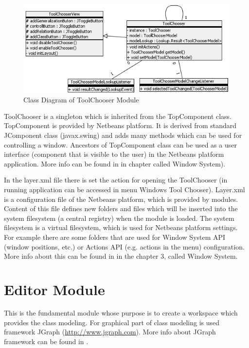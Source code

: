 \begin{figure}[!ht]
\begin{center}
\includegraphics[width=\textwidth]{img/ToolChooserModuleToolChooser.png}
\caption{Class Diagram of ToolChooser Module}
\label{f-ToolChooserModuleToolChooser}
\end{center}
\end{figure}

ToolChooser is a singleton which is inherited from the TopComponent class. TopComponent is provided by Netbeans platform. It is derived from standard JComponent class (javax.swing) and adds many methods which can be used for controlling a window. Ancestors of TopComponent class can be used as a user interface (component that is visible to the user) in the Netbeans platform application. More info can be found in \cite{netbeans6.9DevGuide} in chapter called Window System).

In the layer.xml file there is set the action for opening the ToolChooser (in running application can be accessed in menu Windows  Tool Chooser). Layer.xml is a configuration file of the Netbeans platform, which is provided by modules. Content of this file defines new folders and files which will be inserted into the system filesystem (a central registry) when the module is loaded. The system filesystem is a virtual filesystem, which is used for Netbeans platform settings. For example there are some folders that are used for Window System API (window positions, etc.) or Actions API (e.g. actions in the menu) configuration. More info about this can be found in \cite{netbeans6.9DevGuide} in the chapter 3, called Window System.

\section{Editor Module}

This is the fundamental module whose purpose is to create a workspace which provides the class modeling. For graphical part of class modeling is used framework JGraph (\url{http://www.jgraph.com}). More info about JGraph framework can be found in \cite{jgraphmanual}.

